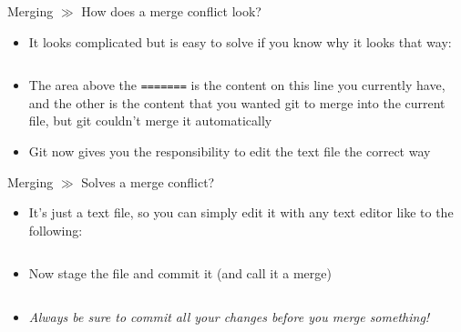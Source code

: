 \documentclass[10pt]{beamer}
\begin{document}
\begin{frame}{Merging $\gg$ How does a merge conflict look?}
	\begin{itemize}
		\item It looks complicated but is easy to solve if you know why it looks that way:
		\inputminted[bgcolor=lightGreyCustom,fontsize=\scriptsize]{diff}{./resources/git_merging_04_create_conflict_output.sh}
		\item The area above the \texttt{=======} is the content on this line you currently have, and the other is the content that you wanted git to merge into the current file, but git couldn't merge it automatically
		\item Git now gives you the responsibility to edit the text file the correct way
	\end{itemize}
\end{frame}

\begin{frame}{Merging $\gg$ Solves a merge conflict?}
\begin{itemize}
		\item It's just a text file, so you can simply edit it with any text editor like to the following:
		\inputminted[bgcolor=lightGreyCustom,fontsize=\scriptsize]{sh}{./resources/git_merging_05_create_conflict_solved.sh}
		\item Now stage the file and commit it (and call it a merge)
		\inputminted[bgcolor=lightGreyCustom,fontsize=\scriptsize]{sh}{./resources/git_merging_06_merge_commit.sh}
		\item \textit{Always be sure to commit all your changes before you merge something!}
	\end{itemize}
\end{frame}
\end{document}
